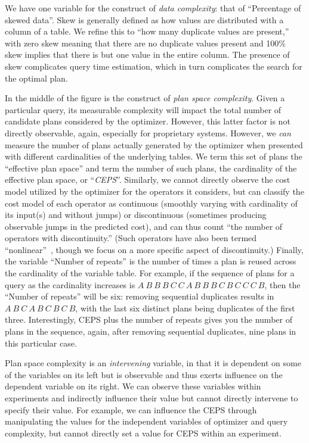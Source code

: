 \documentclass[prodmode,acmtods]{acmsmall}
\begin{document}
We have one variable for the construct of {\em data complexity}: that of
``Percentage of skewed data''.  Skew is generally defined as how values are
distributed with a column of a table. We refine this to ``how many duplicate
values are present,'' with zero skew meaning that there are no duplicate
values present and 100\% skew implies that there is but one value in the
entire column. The presence of skew complicates query time estimation, which
in turn complicates the search for the optimal plan.

In the middle of the figure is the construct of {\em plan space
complexity}. Given a particular query, its measurable
complexity will impact the total number of candidate plans considered
by the optimizer. However, this latter factor is not directly
observable, again, especially for proprietary \hbox{systems}. However, we {\em
can} measure the number of plans actually generated by the optimizer
when presented with different cardinalities of the underlying tables.
We term this set of plans the ``effective plan
space'' and term the number of such plans, the cardinality of the
effective plan space, or ``{\em CEPS}''. Similarly, we cannot directly observe
the cost model utilized by the optimizer for the operators it considers, but
can classify the cost model of each operator as continuous (smoothly varying
with cardinality of its input(s) and without jumps) or discontinuous
(sometimes producing observable jumps in the predicted
cost), and can thus count ``the number of operators with
discontinuity.'' (Such operators have also been termed
``nonlinear''~\cite{Hulgen03}, though we focus on a more specific aspect of
discontinuity.) Finally, the variable ``Number of repeats'' is the number
of times a plan is reused across the cardinality of the variable table. For
example, if the sequence of plans for a query as the cardinality increases
is $A ~ B ~ B ~ B ~ C ~ C ~ A ~ B ~ B~ B ~ C ~ B ~ C ~ C ~ C ~ B$, then the
``Number of repeats'' will be six: removing sequential duplicates results in $A ~ B ~ C
~ A ~ B ~ C ~ B ~ C ~ B$, with the last six distinct plans being duplicates
of the first three. Interestingly, CEPS plus the number of repeats gives you the
number of plans in the sequence, again, after removing sequential
duplicates, nine plans in this particular case.

Plan space complexity is an {\em intervening} variable, in that it is dependent
on some of the variables on its left but is observable and thus  exerts influence on the dependent
variable on its right. We can observe these variables within experiments and
indirectly influence their value but
cannot directly intervene to specify their value. For example, we can influence the CEPS through
manipulating the values for the independent variables of optimizer and query
complexity, but cannot directly set a value for CEPS within an
experiment.
\end{document}
